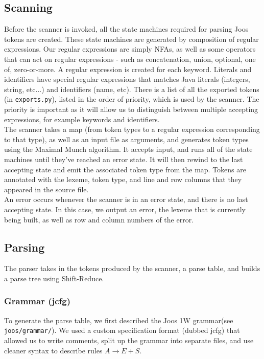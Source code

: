 \documentclass[12pt, a4paper]{article}
\begin{document}
\subsection{Scanning}

Before the scanner is invoked, all the state machines required for parsing Joos tokens are created. These state machines are generated by composition of regular expressions. Our regular expressions are simply NFAs, as well as some operators that can act on regular expressions - such as concatenation, union, optional, one of, zero-or-more. A regular expression is created for each keyword. Literals and identifiers have special regular expressions that matches Java literals (integers, string, etc...) and identifiers (name, etc). There is a list of all the exported tokens (in \verb|exports.py|), listed in the order of priority, which is used by the scanner. The priority is important as it will allow us to distinguish between multiple accepting expressions, for example keywords and identifiers. \\

The scanner takes a map (from token types to a regular expression corresponding to that type), as well as an input file as arguments, and generates token types using the Maximal Munch algorithm. It accepts input, and runs all of the state machines until they've reached an error state. It will then rewind to the last accepting state and emit the associated token type from the map. Tokens are annotated with the lexeme, token type, and line and row columns that they appeared in the source file. \\

An error occurs whenever the scanner is in an error state, and there is no last accepting state. In this case, we output an error, the lexeme that is currently being built, as well as row and column numbers of the error.

\subsection{Parsing}

The parser takes in the tokens produced by the scanner, a parse table, and builds a parse tree using Shift-Reduce.

\subsubsection{Grammar (jcfg)}
To generate the parse table, we first described the Joos 1W grammar(see \verb|joos/grammar/|). We used a custom specification format (dubbed jcfg) that allowed us to write comments, split up the grammar into separate files, and use cleaner syntax to describe rules $A \rightarrow E + S$. \\
\end{document}
